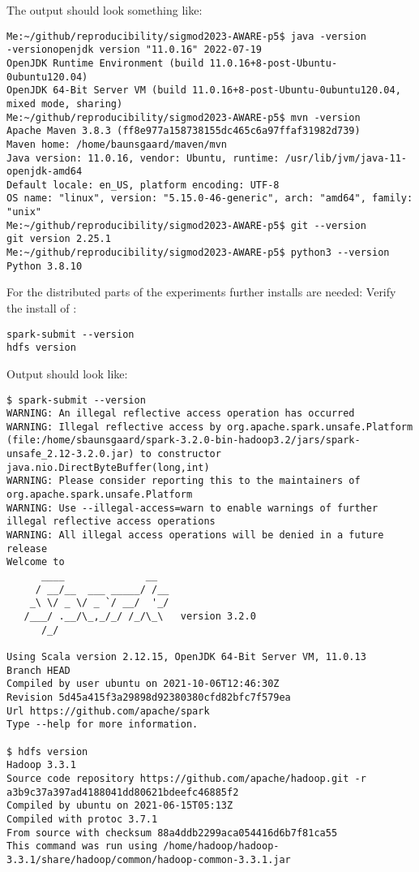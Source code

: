 \documentclass{readme}
\begin{document}
The output should look something like:

\begin{lstlisting}
Me:~/github/reproducibility/sigmod2023-AWARE-p5$ java -version
-versionopenjdk version "11.0.16" 2022-07-19
OpenJDK Runtime Environment (build 11.0.16+8-post-Ubuntu-0ubuntu120.04)
OpenJDK 64-Bit Server VM (build 11.0.16+8-post-Ubuntu-0ubuntu120.04, mixed mode, sharing)
Me:~/github/reproducibility/sigmod2023-AWARE-p5$ mvn -version
Apache Maven 3.8.3 (ff8e977a158738155dc465c6a97ffaf31982d739)
Maven home: /home/baunsgaard/maven/mvn
Java version: 11.0.16, vendor: Ubuntu, runtime: /usr/lib/jvm/java-11-openjdk-amd64
Default locale: en_US, platform encoding: UTF-8
OS name: "linux", version: "5.15.0-46-generic", arch: "amd64", family: "unix"
Me:~/github/reproducibility/sigmod2023-AWARE-p5$ git --version
git version 2.25.1
Me:~/github/reproducibility/sigmod2023-AWARE-p5$ python3 --version
Python 3.8.10
\end{lstlisting}

For the distributed parts of the experiments further installs are needed:
Verify the install of :

\begin{lstlisting}
spark-submit --version
hdfs version
\end{lstlisting}


Output should look like:

\begin{lstlisting}
$ spark-submit --version
WARNING: An illegal reflective access operation has occurred
WARNING: Illegal reflective access by org.apache.spark.unsafe.Platform (file:/home/sbaunsgaard/spark-3.2.0-bin-hadoop3.2/jars/spark-unsafe_2.12-3.2.0.jar) to constructor java.nio.DirectByteBuffer(long,int)
WARNING: Please consider reporting this to the maintainers of org.apache.spark.unsafe.Platform
WARNING: Use --illegal-access=warn to enable warnings of further illegal reflective access operations
WARNING: All illegal access operations will be denied in a future release
Welcome to
      ____              __
     / __/__  ___ _____/ /__
    _\ \/ _ \/ _ `/ __/  '_/
   /___/ .__/\_,_/_/ /_/\_\   version 3.2.0
      /_/
                        
Using Scala version 2.12.15, OpenJDK 64-Bit Server VM, 11.0.13
Branch HEAD
Compiled by user ubuntu on 2021-10-06T12:46:30Z
Revision 5d45a415f3a29898d92380380cfd82bfc7f579ea
Url https://github.com/apache/spark
Type --help for more information.

$ hdfs version
Hadoop 3.3.1
Source code repository https://github.com/apache/hadoop.git -r a3b9c37a397ad4188041dd80621bdeefc46885f2
Compiled by ubuntu on 2021-06-15T05:13Z
Compiled with protoc 3.7.1
From source with checksum 88a4ddb2299aca054416d6b7f81ca55
This command was run using /home/hadoop/hadoop-3.3.1/share/hadoop/common/hadoop-common-3.3.1.jar
\end{lstlisting}
\end{document}
